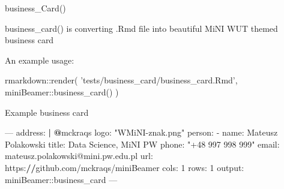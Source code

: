 \documentclass[ignorenonframetext,]{beamer}
\newenvironment{Shaded}{}{}
\newcommand{\DecValTok}[1]{#1}
\newcommand{\ErrorTok}[1]{\textcolor[rgb]{1.00,0.00,0.00}{\textbf{#1}}}
\newcommand{\KeywordTok}[1]{\textcolor[rgb]{0.00,0.00,1.00}{#1}}
\newcommand{\NormalTok}[1]{#1}
\newcommand{\OperatorTok}[1]{#1}
\newcommand{\StringTok}[1]{\textcolor[rgb]{0.00,0.50,0.50}{#1}}
\begin{document}
\begin{frame}[fragile]{business\_Card()}
\protect\hypertarget{business_card-1}{}

business\_card() is converting .Rmd file into beautiful MiNI WUT themed
business card

An example usage:

\scriptsize

\begin{Shaded}
\begin{Highlighting}[]
\NormalTok{rmarkdown}\OperatorTok{::}\KeywordTok{render}\NormalTok{(}
  \StringTok{'tests/business_card/business_card.Rmd'}\NormalTok{, miniBeamer}\OperatorTok{::}\KeywordTok{business_card}\NormalTok{()}
\NormalTok{)}
\end{Highlighting}
\end{Shaded}

\end{frame}

\begin{frame}[fragile]{Example business card}
\protect\hypertarget{example-business-card}{}

\scriptsize

\begin{Shaded}
\begin{Highlighting}[]
\OperatorTok{---}
\NormalTok{address}\OperatorTok{:}\StringTok{ }\ErrorTok{|}
\StringTok{  }\ErrorTok{@}\NormalTok{mckraqs}
\NormalTok{logo}\OperatorTok{:}\StringTok{ "WMiNI-znak.png"}
\NormalTok{person}\OperatorTok{:}
\StringTok{  }\OperatorTok{-}\StringTok{ }\NormalTok{name}\OperatorTok{:}\StringTok{ }\NormalTok{Mateusz Polakowski}
\NormalTok{    title}\OperatorTok{:}\StringTok{ }\NormalTok{Data Science, MiNI PW}
\NormalTok{    phone}\OperatorTok{:}\StringTok{ "+48 997 998 999"}
\NormalTok{    email}\OperatorTok{:}\StringTok{ }\NormalTok{mateusz.polakowski}\OperatorTok{@}\NormalTok{mini.pw.edu.pl}
\NormalTok{    url}\OperatorTok{:}\StringTok{ }\NormalTok{https}\OperatorTok{:}\ErrorTok{//}\NormalTok{github.com}\OperatorTok{/}\NormalTok{mckraqs}\OperatorTok{/}\NormalTok{miniBeamer}
\NormalTok{cols}\OperatorTok{:}\StringTok{ }\DecValTok{1}
\NormalTok{rows}\OperatorTok{:}\StringTok{ }\DecValTok{1}
\NormalTok{output}\OperatorTok{:}\StringTok{ }\NormalTok{miniBeamer}\OperatorTok{::}\NormalTok{business_card}
\OperatorTok{---}
\end{Highlighting}
\end{Shaded}

\end{frame}
\end{document}
